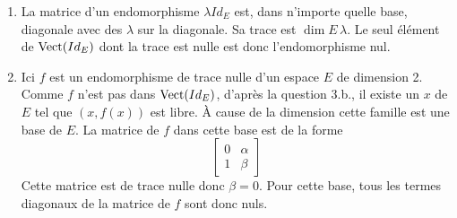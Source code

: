 \begin{enumerate}
\begin{enumerate}
\item La matrice d'un endomorphisme $\lambda Id_E$ est, dans n'importe quelle base, diagonale avec des $\lambda$ sur la diagonale. Sa trace est $\dim E\, \lambda$. Le seul élément de $\operatorname{Vect}(Id_E)$ dont la trace est nulle est donc l'endomorphisme nul. 

\item Ici $f$ est un endomorphisme de trace nulle d'un espace $E$ de dimension 2. Comme $f$ n'est pas dans $\operatorname{Vect}(Id_E)$, d'après la question 3.b., il existe un $x$ de $E$ tel que $(x,f(x))$ est libre. \`A cause de la dimension cette famille est une base de $E$. La matrice de $f$ dans cette base est de la forme
\begin{displaymath}
 \begin{bmatrix}
  0 & \alpha \\
 1 & \beta
 \end{bmatrix}
\end{displaymath}
Cette matrice est de trace nulle donc $\beta=0$. Pour cette base, tous les termes diagonaux de la matrice de $f$ sont donc nuls.


\end{enumerate}
\end{enumerate}
